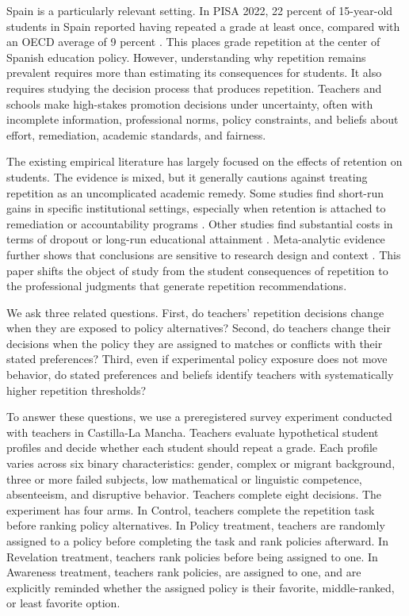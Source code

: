 \documentclass[12pt,a4paper]{article}
\begin{document}
Spain is a particularly relevant setting. In PISA 2022, 22 percent of 15-year-old students in Spain reported having repeated a grade at least once, compared with an OECD average of 9 percent \citep{oecd2023spain}. This places grade repetition at the center of Spanish education policy. However, understanding why repetition remains prevalent requires more than estimating its consequences for students. It also requires studying the decision process that produces repetition. Teachers and schools make high-stakes promotion decisions under uncertainty, often with incomplete information, professional norms, policy constraints, and beliefs about effort, remediation, academic standards, and fairness.

The existing empirical literature has largely focused on the effects of retention on students. The evidence is mixed, but it generally cautions against treating repetition as an uncomplicated academic remedy. Some studies find short-run gains in specific institutional settings, especially when retention is attached to remediation or accountability programs \citep{jacob2004}. Other studies find substantial costs in terms of dropout or long-run educational attainment \citep{manacorda2012,jacob2009,cabrera2022}. Meta-analytic evidence further shows that conclusions are sensitive to research design and context \citep{allen2009}. This paper shifts the object of study from the student consequences of repetition to the professional judgments that generate repetition recommendations.

We ask three related questions. First, do teachers' repetition decisions change when they are exposed to policy alternatives? Second, do teachers change their decisions when the policy they are assigned to matches or conflicts with their stated preferences? Third, even if experimental policy exposure does not move behavior, do stated preferences and beliefs identify teachers with systematically higher repetition thresholds?

To answer these questions, we use a preregistered survey experiment conducted with teachers in Castilla-La Mancha. Teachers evaluate hypothetical student profiles and decide whether each student should repeat a grade. Each profile varies across six binary characteristics: gender, complex or migrant background, three or more failed subjects, low mathematical or linguistic competence, absenteeism, and disruptive behavior. Teachers complete eight decisions. The experiment has four arms. In Control, teachers complete the repetition task before ranking policy alternatives. In Policy treatment, teachers are randomly assigned to a policy before completing the task and rank policies afterward. In Revelation treatment, teachers rank policies before being assigned to one. In Awareness treatment, teachers rank policies, are assigned to one, and are explicitly reminded whether the assigned policy is their favorite, middle-ranked, or least favorite option.
\end{document}
